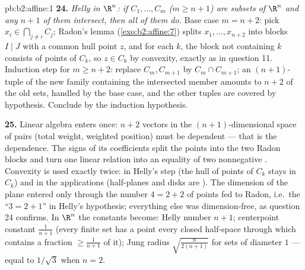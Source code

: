 \begin{solution}{pb:b2:affine:1}
\textbf{24.} \emph{Helly in $\R^n$: if $C_1, \dots, C_m$
($m \geq n + 1$) are  subsets of $\R^n$ and any $n + 1$
of them intersect, then all of them do.} Base case $m = n +
2$: pick $x_i \in \bigcap_{j\neq i}C_j$; Radon's lemma
(\cref{exo:b2:affine:7}) splits $x_1, \dots, x_{n+2}$ into
blocks $I \mid J$ with a common hull point $z$, and for each
$k$, the block not containing $k$ consists of points of
$C_k$, so $z \in C_k$ by convexity, exactly as in question
11. Induction step for $m \geq n + 2$: replace $C_m,
C_{m+1}$ by $C_m \cap C_{m+1}$; an $(n+1)$-tuple of the new
family containing the intersected member amounts to $n + 2$
of the old sets, handled by the base case, and the other
tuples are covered by hypothesis. Conclude by the induction
hypothesis.

\textbf{25.} Linear algebra enters once: $n + 2$ vectors in
the $(n+1)$-dimensional space of pairs (total weight,
weighted position) must be dependent --- that is the 
dependence. The signs of its coefficients split the points
into the two Radon blocks and turn one linear relation into
an equality of two nonnegative . Convexity is used
exactly twice: in Helly's step (the hull of points of $C_k$
stays in $C_k$) and in the applications (half-planes and
disks are ). The dimension of the plane entered only
through the number $4 = 2 + 2$ of points fed to Radon, i.e.\
the ``$3 = 2 + 1$'' in Helly's hypothesis; everything else
was dimension-free, as question 24 confirms. In $\R^n$ the
constants become: Helly number $n + 1$; centerpoint constant
$\frac1{n+1}$ (every finite set has a point every closed
half-space through which contains a fraction $\geq
\frac1{n+1}$ of it); Jung radius
$\sqrt{\frac{n}{2(n+1)}}$ for sets of diameter $1$ --- equal
to $1/\sqrt3$ when $n = 2$.
\end{solution}
